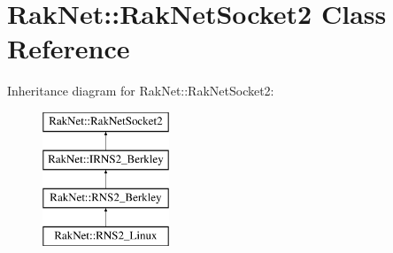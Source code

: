 \hypertarget{class_rak_net_1_1_rak_net_socket2}{\section{Rak\-Net\-:\-:Rak\-Net\-Socket2 Class Reference}
\label{class_rak_net_1_1_rak_net_socket2}
}
Inheritance diagram for Rak\-Net\-:\-:Rak\-Net\-Socket2\-:\begin{figure}[H]
\begin{center}
\leavevmode
\includegraphics[height=4.000000cm]{class_rak_net_1_1_rak_net_socket2}
\end{center}
\end{figure}
